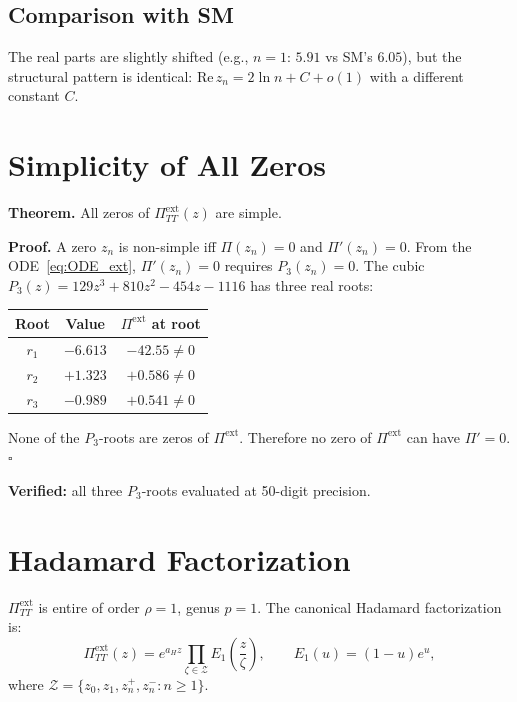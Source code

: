 \documentclass[11pt,a4paper]{article}
\newcommand{\proven}[1]{\textcolor{verified}{\textbf{#1}}}
\begin{document}
\subsection{Comparison with SM}

The real parts are slightly shifted (e.g., $n=1$: $5.91$ vs SM's $6.05$),
but the structural pattern is identical:
$\mathrm{Re}\,z_n = 2\ln n + C + o(1)$ with a different constant $C$.


\section{Simplicity of All Zeros}
\label{sec:simplicity}

\textbf{Theorem.} All zeros of $\Pi_{TT}^{\mathrm{ext}}(z)$ are simple.

\textbf{Proof.}
A zero $z_n$ is non-simple iff $\Pi(z_n) = 0$ and $\Pi'(z_n) = 0$.
From the ODE~\eqref{eq:ODE_ext}, $\Pi'(z_n) = 0$ requires $P_3(z_n) = 0$.
The cubic $P_3(z) = 129z^3 + 810z^2 - 454z - 1116$ has three real roots:
\begin{center}
\begin{tabular}{ccc}
\toprule
Root & Value & $\Pi^{\mathrm{ext}}$ at root \\
\midrule
$r_1$ & $-6.613$ & $-42.55 \neq 0$ \\
$r_2$ & $+1.323$ & $+0.586 \neq 0$ \\
$r_3$ & $-0.989$ & $+0.541 \neq 0$ \\
\bottomrule
\end{tabular}
\end{center}

None of the $P_3$-roots are zeros of $\Pi^{\mathrm{ext}}$.
Therefore no zero of $\Pi^{\mathrm{ext}}$ can have $\Pi' = 0$. \hfill$\square$

\proven{Verified:} all three $P_3$-roots evaluated at 50-digit precision.


\section{Hadamard Factorization}

$\Pi_{TT}^{\mathrm{ext}}$ is entire of order $\rho = 1$, genus $p = 1$.
The canonical Hadamard factorization is:
\begin{equation}
  \Pi_{TT}^{\mathrm{ext}}(z) = e^{a_H z}
  \prod_{\zeta \in \mathcal{Z}} E_1\!\left(\frac{z}{\zeta}\right),
  \qquad E_1(u) = (1-u)e^u,
\end{equation}
where $\mathcal{Z} = \{z_0, z_1, z_n^+, z_n^- : n \geq 1\}$.
\end{document}
